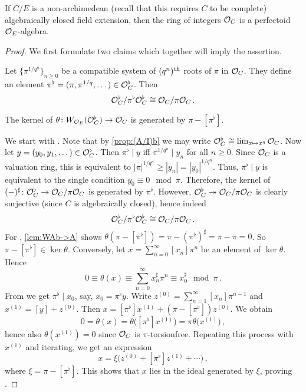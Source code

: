 \label{exm:OCperfectoid}
If $C/E$ is a non-archimedean (recall that this requires $C$ to be complete) algebraically closed field extension, then the ring of integers $\mathcal{O}_C$ is a perfectoid $\mathcal{O}_E$-algebra.
\begin{proof}
	We first formulate two claims which together will imply the assertion.
	\begin{numerate}
		\item Let $\{\pi^{1/q^n}\}_{n\geq 0}$ be a compatible system of $(q^n)^{\text{th}}$ roots of $\pi$ in $\mathcal{O}_C$. They define an element $\pi^\flat=(\pi,\pi^{1/q},\dotsc)\in\mathcal{O}_C^\flat$. Then 
		\begin{equation*}
			\mathcal{O}_C^\flat/\pi^\flat\mathcal{O}_C^\flat\cong\mathcal{O}_C/\pi\mathcal{O}_C\,.
		\end{equation*}
		\item The kernel of $\theta\colon W_{\Oo_E}(\Oo_C^\flat)\morphism\Oo_C$ is generated by $\pi-[\pi^\flat]$.
	\end{numerate}
	We start with . Note that by \cref{prop:(A/I)b} we may write $\mathcal{O}_C^\flat\cong \lim_{x\mapsto x^q}\mathcal{O}_C$. Now let $y=(y_0,y_1,\dotsc)\in\mathcal{O}_C^\flat$. Then $\pi^\flat\mid y$ iff $\pi^{1/q^n}\mid y_n$ for all $n\geq 0$. Since $\mathcal{O}_C$ is a valuation ring, this is equivalent to $|\pi|^{1/q^n}\geq |y_n|=|y_0|^{1/q^n}$. Thus, $\pi^\flat\mid y$ is equivalent to the single condition $y_0\equiv 0\mod \pi$. Therefore, the kernel of $(-)^\sharp\colon \Oo_C^\flat\morphism \Oo_C/\pi\Oo_C$ is generated by $\pi^\flat$. However, $\Oo_C^\flat\epimorphism \Oo_C/\pi\Oo_C$ is clearly surjective (since $C$ is algebraically closed), hence indeed
	\begin{equation*}
		\mathcal{O}_C^\flat/\pi^\flat\mathcal{O}_C^\flat\cong \mathcal{O}_C/\pi\mathcal{O}_C\,.
	\end{equation*}
	For , \cref{lem:WAb->A} shows $\theta(\pi-[\pi^\flat])=\pi-(\pi^\flat)^\sharp=\pi-\pi=0$. So $\pi-[\pi^\flat]\in\ker\theta$. Conversely, let $x=\sum_{n=0}^\infty[x_n]\pi^n$ be an element of $\ker\theta$. Hence
	\begin{equation*}
		0\equiv \theta(x)\equiv \sum_{n=0}^\infty x_n^\sharp\pi^n\equiv x_0^\sharp\mod \pi\,.
	\end{equation*}
	From  we get $\pi^\flat\mid x_0$, say, $x_0=\pi^\flat y$. Write $z^{(0)}=\sum_{n=1}^\infty [x_n]\pi^{n-1}$ and $x^{(1)}=[y]+z^{(0)}$. Then $x=[\pi^\flat]x^{(1)}+(\pi-[\pi^\flat])z^{(0)}$. We obtain
	\begin{equation*}
		0=\theta(x)=\theta\big([\pi^\flat]x^{(1)}\big)=\pi\theta\big(x^{(1)}\big)\,,
	\end{equation*}
	hence also $\theta(x^{(1)})=0$ since $\mathcal{O}_C$ is $\pi$-torsionfree. Repeating this process with $x^{(1)}$ and iterating, we get an expression
	\begin{equation*}
		x=\xi\big(z^{(0)}+[\pi^\flat]z^{(1)}+\dotsb\big)\,,
	\end{equation*}
	where $\xi=\pi-[\pi^\flat]$. This shows that $x$ lies in the ideal generated by $\xi$, proving .
	

\end{proof}
